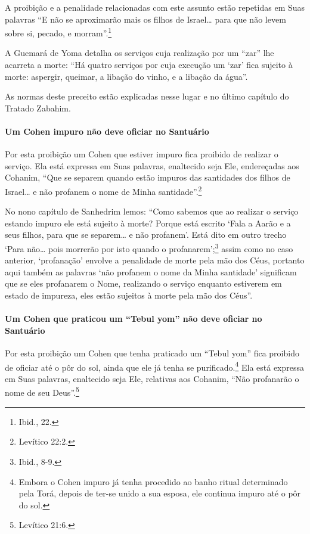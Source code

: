 A proibição e a penalidade relacionadas com este assunto estão repetidas
em Suas palavras ``E não se aproximarão mais os filhos de Israel\ldots{} para
que não levem sobre si, pecado, e morram''.\footnote{Ibid., 22.}

A Guemará de Yoma detalha os serviços cuja realização por um ``zar'' lhe
acarreta a morte: ``Há quatro serviços por cuja execução um `zar' fica
sujeito à morte: aspergir, queimar, a libação do vinho, e a libação da
água''.

As normas deste preceito estão explicadas nesse lugar e no último
capítulo do Tratado Zabahim.


\paragraph{Um Cohen impuro não deve oficiar no Santuário}

Por esta proibição um Cohen que estiver impuro fica proibido de
realizar o serviço. Ela está expressa em Suas palavras, enaltecido seja
Ele, endereçadas aos Cohanim, ``Que se separem quando estão impuros
das santidades dos filhos de Israel\ldots{} e não profanem o nome de Minha
santidade''.\footnote{Levítico 22:2.}

No nono capítulo de Sanhedrim lemos: ``Como sabemos que ao realizar o
serviço estando impuro ele está sujeito à morte? Porque está escrito
`Fala a Aarão e a seus filhos, para que se separem\ldots{} e não profanem'.
Está dito em outro trecho `Para não\ldots{} pois morrerão por isto quando o
profanarem';\footnote{Ibid., 8-9.} assim como no caso anterior, `profanação'
envolve a penalidade de morte pela mão dos Céus, portanto aqui também as
palavras `não profanem o nome da Minha santidade' significam que se eles
profanarem o Nome, realizando o serviço enquanto estiverem em estado de
impureza, eles estão sujeitos à morte pela mão dos Céus''.

\paragraph{Um Cohen que praticou um ``Tebul yom'' não deve oficiar no
Santuário}

Por esta proibição um Cohen que tenha praticado um ``Tebul yom''
fica proibido de oficiar até o pôr do sol, ainda que ele já tenha se
purificado.\footnote{Embora o Cohen impuro já tenha procedido ao banho ritual
determinado pela Torá, depois de ter-se unido a sua esposa, ele
continua impuro até o pôr do sol.} Ela está expressa em Suas palavras,
enaltecido seja Ele, relativas aos Cohanim, ``Não profanarão o nome
de seu Deus''.\footnote{Levítico 21:6.}

